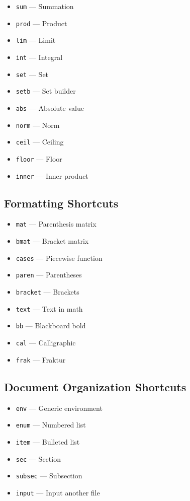 \documentclass{article}
\begin{document}
\begin{itemize}
    \item \texttt{sum} --- Summation
    \item \texttt{prod} --- Product
    \item \texttt{lim} --- Limit
    \item \texttt{int} --- Integral
    \item \texttt{set} --- Set
    \item \texttt{setb} --- Set builder
    \item \texttt{abs} --- Absolute value
    \item \texttt{norm} --- Norm
    \item \texttt{ceil} --- Ceiling
    \item \texttt{floor} --- Floor
    \item \texttt{inner} --- Inner product
\end{itemize}

\subsection{Formatting Shortcuts}

\begin{itemize}
    \item \texttt{mat} --- Parenthesis matrix
    \item \texttt{bmat} --- Bracket matrix
    \item \texttt{cases} --- Piecewise function
    \item \texttt{paren} --- Parentheses
    \item \texttt{bracket} --- Brackets
    \item \texttt{text} --- Text in math
    \item \texttt{bb} --- Blackboard bold
    \item \texttt{cal} --- Calligraphic
    \item \texttt{frak} --- Fraktur
\end{itemize}

\subsection{Document Organization Shortcuts}

\begin{itemize}
    \item \texttt{env} --- Generic environment
    \item \texttt{enum} --- Numbered list
    \item \texttt{item} --- Bulleted list
    \item \texttt{sec} --- Section
    \item \texttt{subsec} --- Subsection
    \item \texttt{input} --- Input another file
\end{itemize}
\end{document}

